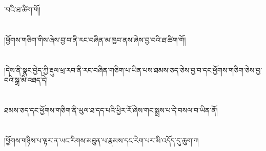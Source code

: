 ་བའི་ཐ་ཚིག་གོ།\chapter{ }།ཕྱོགས་གཅིག་གིས་ཞེས་བྱ་བ་ནི་རང་བཞིན་མ་ཁྱབ་ནས་ཞེས་བྱ་བའི་ཐ་ཚིག་གོ།\chapter{ }།དེས་ནི་སྣང་བྱེད་ཀྱི་རྡུལ་ཕྲ་རབ་ནི་རང་བཞིན་གཅིག་པ་ཡིན་པས་ཐམས་ཅད་ཅེས་བྱ་བ་དང་ཕྱོགས་གཅིག་ཅེས་བྱ་བའི་སྒྲ་མི་འཐད་དེ།\chapter{ }ཐམས་ཅད་དང་ཕྱོགས་གཅིག་ནི་ཡུལ་ཐ་དད་པའི་ཕྱིར་རོ་ཞེས་གང་སྨྲས་པ་དེ་བསལ་བ་ཡིན་ནོ།\chapter{ }།ཕྱོགས་གཉིས་པ་ལྟར་ན་ཡང་རིགས་མཐུན་པ་རྣམས་དང་རེག་པར་མི་འདོད་དུ་ཆུག་ཀ